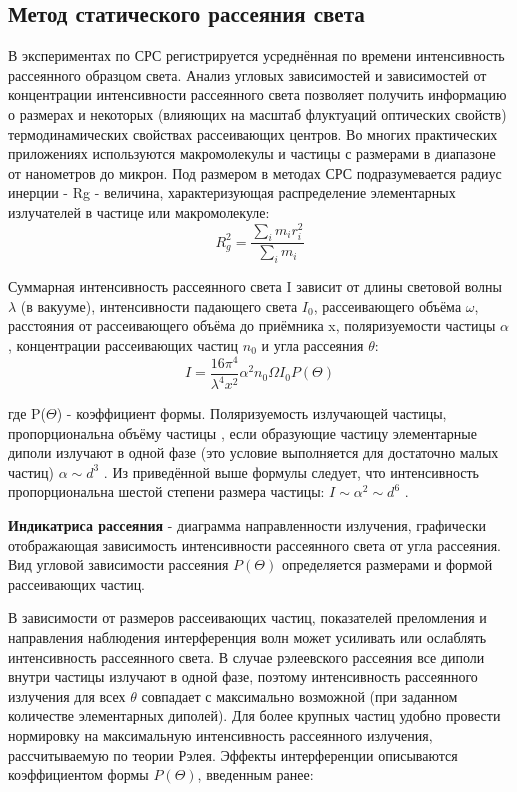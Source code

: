\documentclass{article}
\begin{document}
\subsection{ Метод статического рассеяния света}\;
\par В экспериментах по СРС регистрируется усреднённая по времени интенсивность рассеянного образцом света. Анализ угловых зависимостей и зависимостей от концентрации
интенсивности рассеянного света позволяет получить информацию о размерах и некоторых (влияющих на масштаб флуктуаций оптических свойств) термодинамических свойствах рассеивающих центров.
Во многих практических приложениях используются макромолекулы и частицы с размерами в диапазоне от нанометров до микрон. Под размером в методах СРС подразумевается радиус инерции - Rg - величина, характеризующая распределение элементарных
излучателей в частице или макромолекуле:
\[ R^2_{g} = \frac{ \sum \limits_{i} m_{i} r^2_{i}}{\sum\limits_{i} m_{i}} \]


Суммарная интенсивность рассеянного света I зависит от длины световой волны $\lambda$
(в вакууме), интенсивности падающего света $I_{0}$, рассеивающего объёма $\omega$, расстояния
от рассеивающего объёма до приёмника x, поляризуемости частицы $\alpha$, концентрации
рассеивающих частиц $n_{0}$ и угла рассеяния $\theta$:
\[I =\frac{16\pi^4}{\lambda^4x^2 }\alpha^2n_{0}\Omega I_{0} P(\Theta)\]

где P($\Theta$) - коэффициент формы.
Поляризуемость излучающей частицы, пропорциональна объёму частицы , если образующие частицу элементарные диполи излучают в одной фазе (это условие выполняется
для достаточно малых частиц) $\alpha \sim d^3$
. Из приведённой выше формулы следует, что
интенсивность пропорциональна шестой степени размера частицы: $ I \sim \alpha^2 \sim d^6$
.

\textbf{Индикатриса рассеяния} - диаграмма направленности излучения, графически отображающая зависимость интенсивности рассеянного света от угла рассеяния.
Вид угловой зависимости рассеяния $P(\Theta)$ определяется размерами и формой рассеивающих частиц.

В зависимости от размеров рассеивающих частиц, показателей преломления и направления наблюдения интерференция волн может усиливать или ослаблять интенсивность рассеянного света. В случае рэлеевского рассеяния все диполи внутри частицы излучают в одной фазе, поэтому интенсивность рассеянного излучения для всех $\theta$ совпадает с
максимально возможной (при заданном количестве элементарных диполей).
Для более крупных частиц удобно провести нормировку на максимальную интенсивность рассеянного излучения, рассчитываемую по теории Рэлея. Эффекты интерференции описываются коэффициентом формы $P(\Theta)$, введенным ранее:
\end{document}
